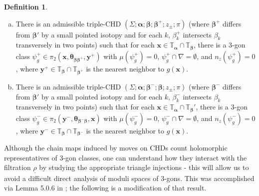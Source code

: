 \documentclass[11pt]{article}
\theoremstyle{plain} \newtheorem{thm}{Theorem}[subsection]
\theoremstyle{plain} \newtheorem{cor}[thm]{Corollary}
\theoremstyle{plain} \newtheorem{prop}[thm]{Proposition}
\theoremstyle{plain} \newtheorem{conj}[thm]{Conjecture}
\theoremstyle{plain} \newtheorem{lem}[thm]{Lemma}
\theoremstyle{definition} \newtheorem{df}[thm]{Definition}
\theoremstyle{remark} \newtheorem{rmk}[thm]{Remark}
\theoremstyle{remark} \newtheorem{obs}[thm]{Observation}
\newcommand{\red}[1]{\underline{#1}}
\newcommand{\ba}{\boldsymbol{\alpha}}
\newcommand{\bb}{\boldsymbol{\beta}}
\newcommand{\Ta}{\mathbb{T}_{\ba}}
\newcommand{\Tb}{\mathbb{T}_{\bb}}
\newcommand{\bx}{\mathbf{x}}
\newcommand{\by}{\mathbf{y}}
\newcommand{\thet}[1]{\boldsymbol{\theta}_{#1}}
\newcommand{\tor}[1]{\mathbb{T}_{#1}}
\newcommand{\AD}{\nabla}
\numberwithin{equation}{section}
\begin{document}
\begin{df}
\begin{enumerate}[(i)]
\begin{enumerate}[(a)]
\item There is an admissible triple-CHD $\left(\Sigma; \ba; \bb; \bb^{+}; z_{\pm}; \pi\right)$ (where $\bb^+$ differs from $\bb'$ by a small pointed isotopy and for each $k$, $\beta^{+}_k$ intersects $\beta_k$ transversely in two points) such that for each $\bx \in \Ta \cap \Tb$, there is a 3-gon class $\psi_{g}^{+} \in \pi_{2}(\bx, \thet{\bb\bb^{+}}, \by^{+})$ with $\mu(\psi_{g}^{+}) = 0$, $\psi_{g}^{+} \cap \AD = \emptyset$, and $n_{z}(\psi_{g}^{+}) = 0$, where $\by^{+} \in \Tb \cap \tor{\bb^{+}}$ is the nearest neighbor to $g(\bx)$.
\item There is an admissible triple-CHD $\left(\Sigma; \ba; \bb^{-}; \bb; z_{\pm}; \pi\right)$ (where $\bb^-$ differs from $\bb'$ by a small pointed isotopy and for each $k$, $\beta^{-}_k$ intersects $\beta_k$ transversely in two points) such that for each $\bx \in \Ta \cap \Tb'$, there is a 3-gon class $\psi_{g}^{-} \in \pi_{2}(\by^{-}, \thet{\bb^{-}\bb}, \bx)$ with $\mu(\psi_{g}^{-}) = 0$, $\psi_{g}^{-} \cap \AD = \emptyset$, and $n_{z}(\psi_{g}^{-}) = 0$, where $\by^{-} \in \Tb \cap \tor{\bb^{-}}$ is the nearest neighbor to $g(\bx)$.
\end{enumerate}
\end{enumerate}
\end{df}

Although the chain maps induced by moves on CHDs count holomorphic representatives of 3-gon classes, one can understand how they interact with the filtration $\red{\rho}$ by studying the appropriate triangle injections - this will allow us to avoid a difficult direct analysis of moduli spaces of 3-gons.  This was accomplished via Lemma 5.0.6 in \cite{et:R}; the following is a modification of that result.
\end{document}
